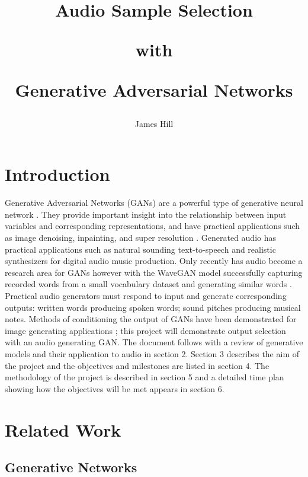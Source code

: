 \documentclass[a4paper, dvipsnames, titlepage]{article}
\title{
  \begin{center}Audio Sample Selection\end{center}
  \begin{center}with\end{center}
  \begin{center}Generative Adversarial Networks\end{center}
  }
\author{James Hill}
\date{}
\begin{document}
\maketitle
\tableofcontents

\newpage

\section{Introduction}

Generative Adversarial Networks (GANs) are a powerful type of generative neural network \citep{2014arXiv1406.2661G}.
They provide important insight into the relationship between input variables and corresponding representations, and have practical applications such as image denoising, inpainting, and super resolution \citep{openai_blog_2017}.
\newline
\newline
Generated audio has practical applications such as natural sounding text-to-speech and realistic synthesizers for digital audio music production.
Only recently has audio become a research area for GANs however with the WaveGAN model successfully capturing recorded words from a small vocabulary dataset and generating similar words \citep{2018arXiv180204208D}.
\newline
\newline
Practical audio generators must respond to input and generate corresponding outputs: written words producing spoken words; sound pitches producing musical notes.
Methods of conditioning the output of GANs have been demonstrated for image generating applications \citep{2014arXiv1411.1784M}; this project will demonstrate output selection with an audio generating GAN.
\newline
\newline
The document follows with a review of generative models and their application to audio in section 2.
Section 3 describes the aim of the project and the objectives and milestones are listed in section 4.
The methodology of the project is described in section 5 and a detailed time plan showing how the objectives will be met appears in section 6.

\newpage

\section{Related Work}

\subsection{Generative Networks}
\end{document}
